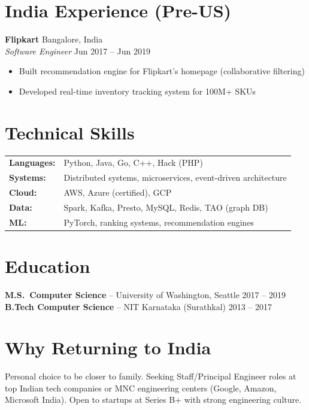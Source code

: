 \documentclass[10pt,letterpaper]{article}
\begin{document}
\section{India Experience (Pre-US)}

\textbf{Flipkart} \hfill Bangalore, India\\
\textit{Software Engineer} \hfill Jun 2017 -- Jun 2019
\begin{itemize}
\item Built recommendation engine for Flipkart's homepage (collaborative filtering)
\item Developed real-time inventory tracking system for 100M+ SKUs
\end{itemize}

\section{Technical Skills}
\begin{tabularx}{\linewidth}{@{}lX@{}}
\textbf{Languages:} & Python, Java, Go, C++, Hack (PHP)\\
\textbf{Systems:} & Distributed systems, microservices, event-driven architecture\\
\textbf{Cloud:} & AWS, Azure (certified), GCP\\
\textbf{Data:} & Spark, Kafka, Presto, MySQL, Redis, TAO (graph DB)\\
\textbf{ML:} & PyTorch, ranking systems, recommendation engines\\
\end{tabularx}

\section{Education}
\textbf{M.S.\ Computer Science} -- University of Washington, Seattle \hfill 2017 -- 2019\\
\textbf{B.Tech Computer Science} -- NIT Karnataka (Surathkal) \hfill 2013 -- 2017

\section{Why Returning to India}
Personal choice to be closer to family. Seeking Staff/Principal Engineer roles at top Indian tech companies or MNC engineering centers (Google, Amazon, Microsoft India). Open to startups at Series B+ with strong engineering culture.
\end{document}
